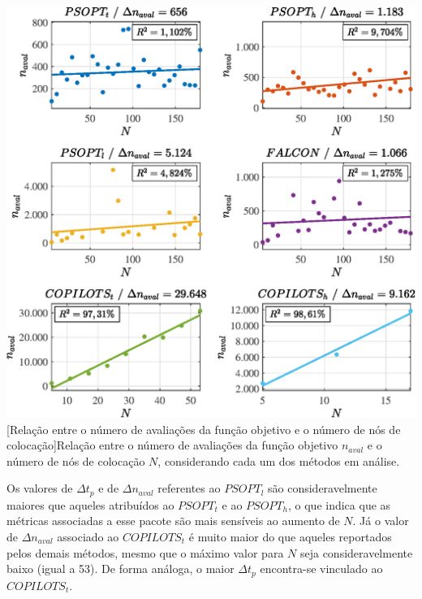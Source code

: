 \noindent
\begin{minipage}{\textwidth}
	\vspace{\onelineskip}
	\centering
	\includegraphics[scale=0.7]{fig/resultados/uav/sens/eval}
	[Relação entre o número de avaliações da função objetivo e o número de nós de colocação]{Relação entre o número de avaliações da função objetivo $ n_{aval} $ e o número de nós de colocação $ N $, considerando cada um dos métodos em análise.}
	\label{fig:uav:sensibilidade:naval}
	\vspace{\onelineskip}
\end{minipage}


Os valores de $ \Delta t_p $ e de $ \Delta n_{aval} $ referentes  ao $ PSOPT_l $ são consideravelmente maiores que aqueles atribuídos ao $ PSOPT_t $ e ao $ PSOPT_h $, o que indica que as métricas associadas a esse pacote são mais sensíveis ao aumento de $ N $. Já o valor de $ \Delta n_{aval} $ associado ao $ COPILOTS_t $ é muito maior do que aqueles reportados pelos demais métodos, mesmo que o máximo valor para $ N $ seja consideravelmente baixo (igual a 53). De forma análoga, o maior $ \Delta t_p $ encontra-se vinculado ao $ COPILOTS_t $. 

